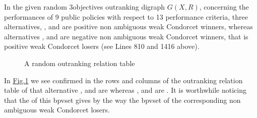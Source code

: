 \documentclass[a4paper,12pt,english]{sphinxhowto}
\let\sphinxpxdimen\pdfpxdimen\else\newdimen\sphinxpxdimen
\begin{document}
\sphinxAtStartPar
In the given random 3\sphinxhyphen{}objectives outranking digraph \(G(X,R)\), concerning the performances of 9 public policies with respect to 13 performance criteria, three alternatives, ,  and  are positive non ambiguous weak Condorcet winners, whereas alternatives ,  and  are negative non ambiguous weak Condorcet winners, that is positive weak Condorcet losers (see Lines 8\sphinxhyphen{}10 and 14\sphinxhyphen{}16 above).

\begin{sphinxVerbatim}[commandchars=\\\{\}]
   \PYG{p}{[}\PYG{p}{]}
\end{sphinxVerbatim}

\begin{figure}[H]
\centering
\capstart

\noindent\sphinxincludegraphics[width=300\sphinxpxdimen]{{condorcetWinners}.png}
\caption{A random outranking relation table}\label{\detokenize{pearls:condorcetwinners2}}\end{figure}

\sphinxAtStartPar
In \hyperref[\detokenize{pearls:condorcetwinners2}]{Fig.\@ \ref{\detokenize{pearls:condorcetwinners2}}} we see confirmed in the rows and columns of the outranking relation table of that alternative ,  and  are  whereas ,  and  are . It is worthwhile noticing that the  of this bpv\sphinxhyphen{}set  gives by the way the bpv\sphinxhyphen{}set of the corresponding non ambiguous weak Condorcet losers.
\end{document}
